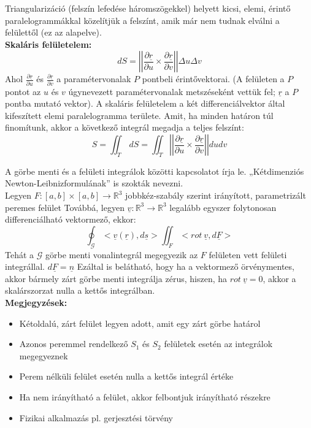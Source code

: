 \documentclass[11pt,a4paper]{article}
\begin{document}
    \begin{tcolorbox}[colback=red!5!white,colframe=red!60!black,title= 6. Felszínszámítás]
        Triangularizáció (felszín lefedése háromszögekkel) helyett kicsi, elemi, érintő paralelogrammákkal közelítjük a felszínt, amik már nem tudnak elválni a felülettől (ez az alapelve). \\
        \textbf{Skaláris felületelem:}
        $$dS = \left|\left|\frac{\partial\underline{r}}{\partial u} \times \frac{\partial\underline{r}}{\partial v}\right|\right|\Delta u \Delta v$$
        Ahol $\frac{\partial\underline{r}}{\partial u}$ és $\frac{\partial\underline{r}}{\partial v}$ a paramétervonalak $P$ pontbeli érintővektorai. (A felületen a $P$ pontot az $u$ és $v$
        úgynevezett paramétervonalak metszéseként vettük fel; $\underline{r}$ a $P$ pontba mutató vektor). A skaláris felületelem a két differenciálvektor által kifeszített elemi paralelogramma területe. Amit, ha minden határon túl finomítunk, akkor a következő integrál megadja a teljes felszínt:
        $$S = \iint_{T}  \,dS = \iint_{T} \left|\left|\frac{\partial\underline{r}}{\partial u} \times \frac{\partial\underline{r}}{\partial v}\right|\right|dudv$$
    \end{tcolorbox}

    \begin{tcolorbox}[colback=red!5!white,colframe=red!60!black,title= 7. Stokes-tétel]
        A görbe menti és a felületi integrálok közötti kapcsolatot írja le. „Kétdimenziós Newton-Leibnizformulának” is szokták nevezni. \\
        Legyen $F: [a,b] \times [a,b] \rightarrow \mathbb{R}^3$ jobbkéz-szabály szerint irányított, parametrizált peremes felület Továbbá, legyen $\underline{v}: \mathbb{R}^3 \rightarrow \mathbb{R}^3$ legalább egyszer folytonosan differenciálható vektormező, ekkor:
        $$\oint_{\mathcal{G}}<\underline{v}(\underline{r}),d\underline{s}> \iint_{F}<rot\ \underline{v},d\underline{F}>$$
        Tehát a $\mathcal{G}$ görbe menti vonalintegrál megegyezik az $F$ felületen vett felületi integrállal. $d\underline{F} = \underline{n}$ Ezáltal is belátható, hogy ha a vektormező örvénymentes, akkor bármely zárt görbe menti integrálja zérus, hiszen, ha $rot\ \underline{v} = 0$, akkor a skalárszorzat nulla a kettős integrálban. \\
        \textbf{Megjegyzések:}
        \begin{itemize}
            \item Kétoldalú, zárt felület legyen adott, amit egy zárt görbe határol
            \item Azonos peremmel rendelkező $S_1$ és $S_2$ felületek esetén az integrálok megegyeznek
            \item Perem nélküli felület esetén nulla a kettős integrál értéke
            \item Ha nem irányítható a felület, akkor felbontjuk irányítható részekre
            \item Fizikai alkalmazás pl. gerjesztési törvény
        \end{itemize}
    \end{tcolorbox}
\end{document}
